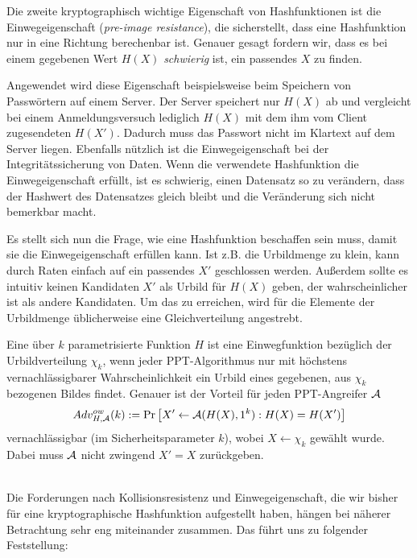Die zweite kryptographisch wichtige Eigenschaft von Hashfunktionen ist die Einwegeigenschaft (\textit{pre-image resistance}), die sicherstellt,
dass eine Hashfunktion nur in eine Richtung berechenbar ist. Genauer gesagt fordern wir, dass es bei einem gegebenen Wert $H(X)$ \emph{schwierig} ist, ein
passendes $X$ zu finden.

Angewendet wird diese Eigenschaft beispielsweise beim Speichern von Passwörtern auf einem Server. Der Server speichert nur $H(X)$ ab und vergleicht bei
einem Anmeldungsversuch lediglich $H(X)$ mit dem ihm vom Client zugesendeten $H(X')$. Dadurch muss das Passwort nicht im Klartext auf dem Server liegen.
Ebenfalls nützlich ist die Einwegeigenschaft bei der Integritätssicherung von Daten. Wenn die verwendete Hashfunktion die Einwegeigenschaft erfüllt, ist
es schwierig, einen Datensatz so zu verändern, dass der Hashwert des Datensatzes gleich bleibt und die Veränderung sich nicht bemerkbar macht.

Es stellt sich nun die Frage, wie eine Hashfunktion beschaffen sein muss, damit sie die Einwegeigenschaft erfüllen kann. Ist z.B. die Urbildmenge zu klein, kann
durch Raten einfach auf ein passendes $X'$ geschlossen werden. Außerdem sollte es intuitiv keinen Kandidaten $X'$ als Urbild für $H(X)$ geben, der
wahrscheinlicher ist als andere Kandidaten. Um das zu erreichen, wird für die Elemente der Urbildmenge üblicherweise eine Gleichverteilung angestrebt.
\vspace{10pt}

\begin{definition}[Einwegfunktion]
Eine über $k$ parametrisierte Funktion $H$ ist eine Einwegfunktion bezüglich der Urbildverteilung $\chi_k$, wenn jeder PPT-Algorithmus nur mit höchstens
vernachlässigbarer Wahrscheinlichkeit ein Urbild eines gegebenen, aus $\chi_k$ bezogenen Bildes findet. Genauer ist der Vorteil für jeden PPT-Angreifer $\mathcal{A}$
\begin{equation*}
Adv^{ow}_{H,\mathcal{A}}(k):= \Pr \left[ X' \leftarrow \mathcal{A}(H(X), 1^k) : H(X) = H(X')\right]
\end{equation*}
vernachlässigbar (im Sicherheitsparameter $k$), wobei $X \leftarrow \chi_k$ gewählt wurde. Dabei muss $\mathcal{A}$ nicht zwingend $X' = X$ zurückgeben.
\end{definition}

~\\
Die Forderungen nach Kollisionsresistenz und Einwegeigenschaft, die wir bisher für eine kryptographische Hashfunktion aufgestellt haben, hängen bei näherer
Betrachtung sehr eng miteinander zusammen. Das führt uns zu folgender Feststellung:
\vspace{10pt}

